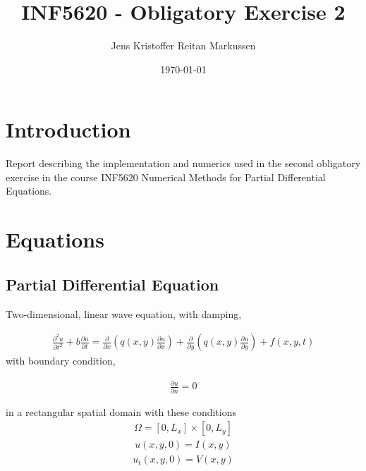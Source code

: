 \documentclass[11pt]{article}
\title{INF5620 - Obligatory Exercise 2}
\author{Jens Kristoffer Reitan Markussen}
\date{\today}
\begin{document}
 	\maketitle 
	
	\section{Introduction}
	Report describing the implementation and numerics used in the second 
	obligatory exercise in the course INF5620 Numerical Methods for Partial
	Differential Equations.
	
	\section{Equations}
		\subsection{Partial Differential Equation}
		Two-dimensional, linear wave equation, with 
		damping,

		\begin{align*}
		\frac{\partial^2u}{\partial t^2}
		+ b\frac{\partial u}{\partial t} 
		= \frac{\partial}{\partial x} 
		\left(q(x,y)\frac{\partial u}{\partial x}
		\right) + \frac{\partial}{\partial y}
		\left(q(x,y)\frac{\partial u}{\partial y}
		\right) + f(x,y,t)
		\end{align*}
		with boundary condition,
		
		\begin{align*}
		\frac{\partial u}{\partial n} = 0		
		\end{align*}				
		
		in a rectangular spatial domain 
		with these conditions
		\begin{align*}
		\Omega = [0, L_x] \times [0, L_y]
		\end{align*}
		\begin{align*}
		u(x,y,0) = I(x,y)
		\end{align*}
		\begin{align*}
		u_t(x,y,0) = V(x,y)
		\end{align*}
						
			
\end{document}
